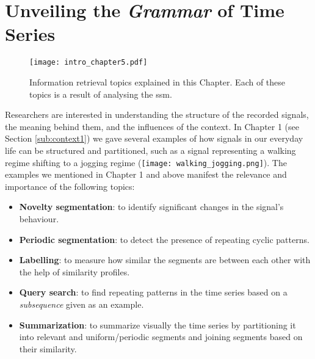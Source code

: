 
%

\chapter{Unveiling the \textit{Grammar} of Time Series}
\label{cha:segmentation}

\begin{figure}[h]
\centering
\texttt{[image: intro\_chapter5.pdf]}
\caption{Information retrieval topics explained in this Chapter. Each of these topics is a result of analysing the \gls{ssm}.}
\label{fig:info_retrieval_topics}
\end{figure}

Researchers are interested in understanding the structure of the recorded signals, the meaning behind them, and the influences of the context. In Chapter 1 (see Section \ref{sub:context1}) we gave several examples of how signals in our everyday life can be structured and partitioned, such as a signal representing a \textcolor{myblue}{walking} regime shifting to a \textcolor{mygreen}{jogging} regime (\texttt{[image: walking\_jogging.png]}). The examples we mentioned in Chapter 1 and above manifest the relevance and importance of the following topics:

\begin{itemize}
     \item \textbf{Novelty segmentation}: to identify significant changes in the signal's behaviour.
    \item \textbf{Periodic segmentation}: to detect the presence of repeating cyclic patterns.
    \item \textbf{Labelling}: to measure how similar the segments are between each other with the help of similarity profiles.
    \item \textbf{Query search}: to find repeating patterns in the time series based on a \textit{subsequence} given as an example.
    \item \textbf{Summarization}: to summarize visually the time series by partitioning it into relevant and uniform/periodic segments and joining segments based on their similarity.
\end{itemize}

